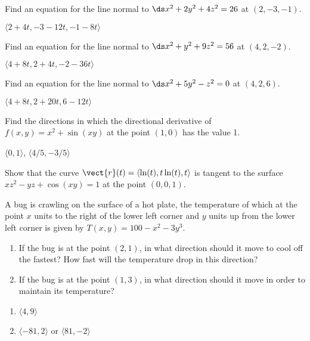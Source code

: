 \begin{enumialphparenastyle}
\begin{ex}
Find an equation for the line normal to 
$\ds x^2+2y^2+4z^2=26 $ at $(2,-3,-1)$.
\begin{sol}
$\langle 2+4t,-3-12t,-1-8t\rangle$
\end{sol}
\end{ex}

\begin{ex}
Find an equation for the line normal to 
$\ds x^2+y^2+9z^2=56$ at $(4,2,-2)$.
\begin{sol}
$\langle 4+8t,2+4t,-2-36t\rangle$
\end{sol}
\end{ex}

\begin{ex}
Find an equation for the line normal to 
$\ds x^2+5y^2-z^2=0$ at $(4,2,6)$.
\begin{sol}
$\langle 4+8t,2+20t,6-12t\rangle$
\end{sol}
\end{ex}

\begin{ex}
Find the directions in which the directional derivative of
$f(x,y)=x^2+\sin(xy)$ at the point $(1,0)$ has the value 1.
\begin{sol}
$\langle 0,1\rangle$, $\langle 4/5,-3/5\rangle$
\end{sol}
\end{ex}

\begin{ex}
Show that the curve 
$\vect{r}(t) = \langle\ln(t),t\ln(t),t\rangle$
is tangent to the surface $xz^2-yz+\cos(xy) = 1$ at the point
$(0,0,1)$.
\end{ex}

\begin{ex}
A bug is crawling on the surface of a hot plate, the
temperature of which at the point $x$ units to the right of the lower
left corner and $y$ units up from the lower left corner is given by
$T(x,y)=100-x^2-3y^3$.

\begin{enumerate}
	\item If the bug is at the point $(2,1)$, in what direction should it
	  move to cool off the fastest?  How fast will the temperature drop in
	  this direction?
	\item If the bug is at the point $(1,3)$, in what direction should it
	  move in order to maintain its temperature?
\end{enumerate}
\begin{sol}
\begin{enumerate}
	\item	$\langle 4,9\rangle$
	\item	$\langle -81,2\rangle$ or $\langle 81,-2\rangle$
\end{enumerate}
\end{sol}
\end{ex}


\end{enumialphparenastyle}
